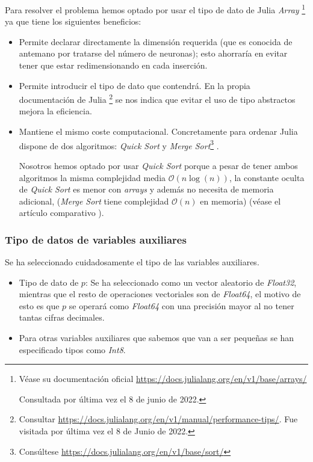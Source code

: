  Para resolver el problema hemos optado 
 por usar el tipo de dato de Julia 
 \textit{Array} \footnote{
    Véase su documentación oficial 
    \url{https://docs.julialang.org/en/v1/base/arrays/}

    Consultada por última vez el 8 de junio de 2022.
}
ya que tiene los siguientes beneficios: 
\begin{itemize}
    \item Permite declarar directamente la dimensión requerida (que es conocida de antemano por tratarse del número de neuronas); esto ahorraría en evitar tener que estar redimensionando en cada inserción.
    \item Permite introducir el tipo de dato que contendrá. En la propia documentación de Julia \footnote{
        Consultar \url{https://docs.julialang.org/en/v1/manual/performance-tips/}.
        Fue visitada por última vez el 8 de Junio de 2022.
    } se nos indica que evitar el uso de tipo abstractos mejora la eficiencia. 
    \item Mantiene el mismo coste computacional.
    Concretamente para ordenar Julia dispone de
    dos algoritmos: \textit{Quick Sort} y \textit{Merge Sort}\footnote{ Consúltese \url{https://docs.julialang.org/en/v1/base/sort/}} . 

    Nosotros hemos optado por usar \textit{Quick Sort} \cite{Quicksort} porque a pesar de tener ambos algoritmos la misma complejidad media $\mathcal{O}(n \log(n))$, la constante oculta de \textit{Quick Sort} es menor con \textit{arrays}  y además no necesita de memoria adicional, (\textit{Merge Sort} \cite{merge-sort} tiene complejidad $\mathcal{O}(n)$ en memoria) (véase el artículo comparativo \cite{quicksort-vs-merge-sort}).
\end{itemize}

\subsubsection{Tipo de datos de variables auxiliares}
Se ha seleccionado cuidadosamente el tipo de las variables auxiliares.
\begin{itemize}
    \item Tipo de dato de $p$: Se ha seleccionado como un vector aleatorio de \textit{Float32}, mientras que el resto de operaciones vectoriales son de \textit{Float64}, el motivo de esto es que $p$ se operará como \textit{Float64} con una precisión mayor al no tener tantas cifras decimales. 
    \item Para otras variables auxiliares que sabemos que van a ser pequeñas se han especificado tipos como \textit{Int8}.
\end{itemize}


